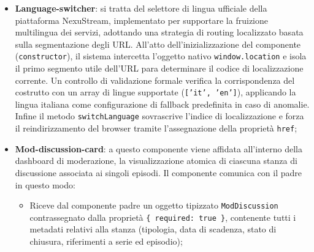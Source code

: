 \documentclass[11pt,a4paper]{article}
\begin{document}
\begin{itemize}
    La logica di controllo associata alla card dell'episodio è definita all'interno della classe \texttt{EpisodeCardComponent}, il cui unico scopo è la formattazione visiva dei dati in ingresso e la propagazione controllata delle interazioni verso i componenti superiori. Mediante l'utilizzo combinato del decoratore \texttt{@Output()} e della classe \texttt{EventEmitter}, il componente espone verso l'esterno due canali di notifica fortemente tipizzati: \texttt{play} e \texttt{info}. All'atto del clic, il componente si limita a emettere l'identificativo univoco dell'entità (\texttt{EpisodeID}), demandando la risoluzione della richiesta al componente genitore. All’interno dei metodi gestori \texttt{onPlay()} e \texttt{onInfo()} viene intercettato l’evento del browser. L'invocazione sequenziale di \texttt{preventDefault()} e \texttt{stopPropagation()} interrompe programmaticamente la catena di propagazione degli eventi (\textit{bubbling}) all'interno dell'albero del DOM. 
    \item \textbf{Language-switcher}: si tratta del selettore di lingua ufficiale della piattaforma NexuStream, implementato per supportare la fruizione multilingua dei servizi, adottando una strategia di routing localizzato basata sulla segmentazione degli URL. All'atto dell'inizializzazione del componente (\texttt{constructor}), il sistema intercetta l'oggetto nativo \texttt{window.location} e isola il primo segmento utile dell'URL para determinare il codice di localizzazione corrente. Un controllo di validazione formale verifica la corrispondenza del costrutto con un array di lingue supportate (\texttt{['it', 'en']}), applicando la lingua italiana come configurazione di fallback predefinita in caso di anomalie. Infine il metodo \texttt{switchLanguage} sovrascrive l'indice di localizzazione e forza il reindirizzamento del browser tramite l'assegnazione della proprietà \texttt{href};
    \item \textbf{Mod-discussion-card}: a questo componente viene affidata all'interno della dashboard di moderazione, la visualizzazione atomica di ciascuna stanza di discussione associata ai singoli episodi. Il componente comunica con il padre in questo modo: 
    \begin{itemize}
        \item Riceve dal componente padre un oggetto tipizzato \texttt{ModDiscussion} contrassegnato dalla proprietà \texttt{\{ required: true \}}, contenente tutti i metadati relativi alla stanza (tipologia, data di scadenza, stato di chiusura, riferimenti a serie ed episodio);

\end{itemize}
\end{itemize}
\end{document}
